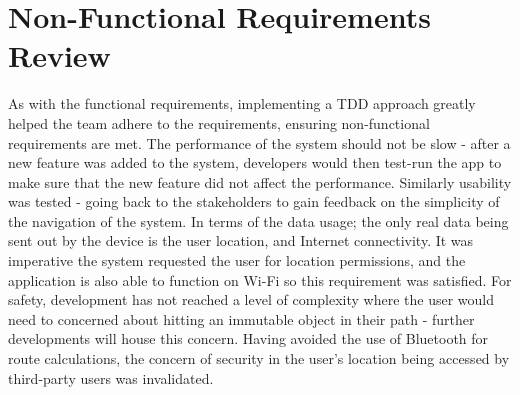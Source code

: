 \section{Non-Functional Requirements Review}
As with the functional requirements, implementing a TDD approach greatly helped the team adhere to the requirements, ensuring non-functional requirements are met. The performance of the system should not be slow - after a new feature was added to the system, developers would then test-run the app to make sure that the new feature did not affect the performance. Similarly usability was tested - going back to the stakeholders to gain feedback on the simplicity of the navigation of the system. In terms of the data usage; the only real data being sent out by the device is the user location, and Internet connectivity. It was imperative the system requested the user for location permissions, and the application is also able to function on Wi-Fi so this requirement was satisfied. For safety, development has not reached a level of complexity where the user would need to concerned about hitting an immutable object in their path - further developments will house this concern. Having avoided the use of Bluetooth for route calculations, the concern of security in the user's location being accessed by third-party users was invalidated. 
